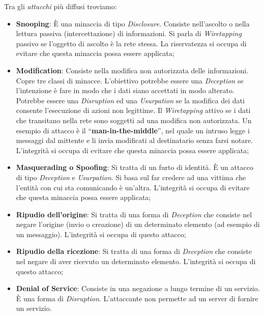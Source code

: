 Tra gli \textit{attacchi} più diffusi troviamo:

\begin{itemize}
      \item \textbf{Snooping}: È una minaccia di tipo \textit{Disclosure}.
            Consiste nell'ascolto o nella lettura passiva (intercettazione) di
            informazioni. Si parla di \textit{Wiretapping} passivo se l'oggetto
            di ascolto è la rete stessa. La riservatezza si occupa di evitare
            che questa minaccia possa essere applicata;
      \item \textbf{Modification}: Consiste nella modifica non autorizzata delle
            informazioni. Copre tre classi di minacce. L'obiettivo potrebbe essere
            una \textit{Deception} se l'intenzione è fare in modo che i dati siano
            accettati in modo alterato. Potrebbe essere una \textit{Disruption}
            ed una \textit{Usurpation} se la modifica dei dati consente l'esecuzione
            di azioni non legittime. Il \textit{Wiretapping} attivo se i dati che
            transitano nella rete sono soggetti ad una modifica non autorizzata.
            Un esempio di attacco è il ``\textbf{man-in-the-middle}'', nel quale un
            intruso legge i messaggi dal mittente e li invia modificati al
            destinatario senza farsi notare. L'integrità si occupa di evitare che
            questa minaccia possa essere applicata;
      \item \textbf{Masquerading o Spoofing}: Si tratta di un furto di identità.
            È un attacco di tipo \textit{Deception} e \textit{Usurpation}.
            Si basa sul far credere ad una vittima che l'entità con cui sta
            comunicando è un'altra. L'integrità si occupa di evitare che questa
            minaccia possa essere applicata;
      \item \textbf{Ripudio dell'origine}: Si tratta di una forma di \textit{Deception}
            che consiste nel negare l'origine (invio o creazione) di un determinato
            elemento (ad esempio di un messaggio). L'integrità si occupa di questo
            attacco;
      \item \textbf{Ripudio della ricezione}: Si tratta di una forma di \textit{Deception}
            che consiste nel negare di aver ricevuto un determinato elemento.
            L'integrità si occupa di questo attacco;
      \item \textbf{Denial of Service}: Consiste in una negazione a lungo termine
            di un servizio. È una forma di \textit{Disruption}. L'attaccante non permette
            ad un server di fornire un servizio.
\end{itemize}

